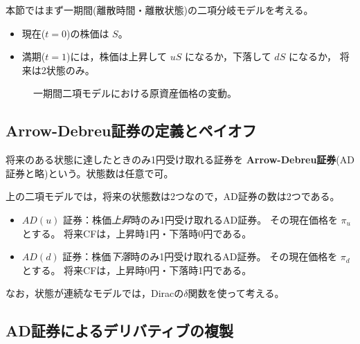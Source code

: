 本節ではまず一期間(離散時間・離散状態)の二項分岐モデルを考える。
\begin{itemize}
\item 現在($t=0$)の株価は $S$。
\item 満期($t=1$)には，株価は上昇して $uS$ になるか，下落して $dS$ になるか，
将来は2状態のみ。
\end{itemize}

\begin{figure}[htbp]
\centering
{}
\caption{一期間二項モデルにおける原資産価格の変動。}
\label{fig:one-period-binomial}
\end{figure}

\subsection{Arrow-Debreu証券の定義とペイオフ}

\begin{definition}
将来のある状態に達したときのみ1円受け取れる証券を
\textbf{Arrow-Debreu証券}(AD証券と略)という。状態数は任意で可。
\end{definition}

上の二項モデルでは，将来の状態数は2つなので，AD証券の数は2つである。
\begin{itemize}
\item $AD(u)$ 証券：株価\emph{上昇}時のみ1円受け取れるAD証券。
その現在価格を $\pi_u$ とする。
将来CFは，上昇時1円・下落時0円である。
\item $AD(d)$ 証券：株価\emph{下落}時のみ1円受け取れるAD証券。
その現在価格を $\pi_d$ とする。
将来CFは，上昇時0円・下落時1円である。
\end{itemize}
なお，状態が連続なモデルでは，Diracの$\delta$関数を使って考える。

\subsection{AD証券によるデリバティブの複製}

